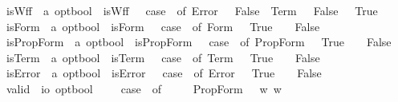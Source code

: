 \begin{isabellebody}
\isamarkuptrue%
\isamarkupfalse%
\ isWff\ {\isacharcolon}{\isacharcolon}\ {\isachardoublequoteopen}{\isacharprime}a\ opt{\isasymRightarrow}bool{\isachardoublequoteclose}\ \ {\isachardoublequoteopen}isWff\ {\isasymphi}\ {\isasymequiv}\ case\ {\isasymphi}\ of\ Error\ {\isasympsi}\ {\isasymRightarrow}\ False\ {\isacharbar}\ Term\ {\isasympsi}\ {\isasymRightarrow}\ False\ {\isacharbar}{\isacharunderscore}\ {\isasymRightarrow}\ True{\isachardoublequoteclose}\isanewline
{}\isamarkupfalse%
\ isForm\ {\isacharcolon}{\isacharcolon}\ {\isachardoublequoteopen}{\isacharprime}a\ opt{\isasymRightarrow}bool{\isachardoublequoteclose}\ \ {\isachardoublequoteopen}isForm\ {\isasymphi}\ {\isasymequiv}\ case\ {\isasymphi}\ of\ Form\ {\isasympsi}\ {\isasymRightarrow}\ True\ {\isacharbar}\ {\isacharunderscore}\ {\isasymRightarrow}\ False{\isachardoublequoteclose}\isanewline
{}\isamarkupfalse%
\ isPropForm\ {\isacharcolon}{\isacharcolon}\ {\isachardoublequoteopen}{\isacharprime}a\ opt{\isasymRightarrow}bool{\isachardoublequoteclose}\ \ {\isachardoublequoteopen}isPropForm\ {\isasymphi}\ {\isasymequiv}\ case\ {\isasymphi}\ of\ PropForm\ {\isasympsi}\ {\isasymRightarrow}\ True\ {\isacharbar}\ {\isacharunderscore}\ {\isasymRightarrow}\ False{\isachardoublequoteclose}\isanewline
{}\isamarkupfalse%
\ isTerm\ {\isacharcolon}{\isacharcolon}\ {\isachardoublequoteopen}{\isacharprime}a\ opt{\isasymRightarrow}bool{\isachardoublequoteclose}\ \ {\isachardoublequoteopen}isTerm\ {\isasymphi}\ {\isasymequiv}\ case\ {\isasymphi}\ of\ Term\ {\isasympsi}\ {\isasymRightarrow}\ True\ {\isacharbar}\ {\isacharunderscore}\ {\isasymRightarrow}\ False{\isachardoublequoteclose}\isanewline
{}\isamarkupfalse%
\ isError\ {\isacharcolon}{\isacharcolon}\ {\isachardoublequoteopen}{\isacharprime}a\ opt{\isasymRightarrow}bool{\isachardoublequoteclose}\ \ {\isachardoublequoteopen}isError\ {\isasymphi}\ {\isasymequiv}\ case\ {\isasymphi}\ of\ Error\ {\isasympsi}\ {\isasymRightarrow}\ True\ {\isacharbar}\ {\isacharunderscore}\ {\isasymRightarrow}\ False{\isachardoublequoteclose}\isanewline
{}\isamarkupfalse%
\ valid\ {\isacharcolon}{\isacharcolon}\ {\isachardoublequoteopen}io\ opt{\isasymRightarrow}bool{\isachardoublequoteclose}\ \ \ {\isachardoublequoteopen}{\isacharbrackleft}{\isasymphi}{\isacharbrackright}\ {\isasymequiv}\ case\ {\isasymphi}\ of\ \isanewline
\ \ \ \ PropForm\ {\isasympsi}\ {\isasymRightarrow}\ {\isasymforall}w{\isachardot}{\isacharparenleft}{\isasympsi}\ w{\isacharparenright}\isanewline

\end{isabellebody}
